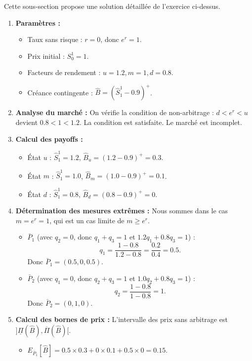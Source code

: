 Cette sous-section propose une solution détaillée de l'exercice ci-dessus.

\begin{enumerate}
    \item \textbf{Paramètres :}
    \begin{itemize}
        \item Taux sans risque : $r=0$, donc $e^r = 1$.
        \item Prix initial : $S_0^1 = 1$.
        \item Facteurs de rendement : $u=1.2, m=1, d=0.8$.
        \item Créance contingente : $\hat{B} = (\hat{S}^1_1 - 0.9)^+$.
    \end{itemize}
    \item \textbf{Analyse du marché :} On vérifie la condition de non-arbitrage : $d < e^r < u$ devient $0.8 < 1 < 1.2$. La condition est satisfaite. Le marché est incomplet.
    \item \textbf{Calcul des payoffs :}
    \begin{itemize}
        \item État $u$ : $\hat{S}^1_1 = 1.2$, $\hat{B}_u = (1.2 - 0.9)^+ = 0.3$.
        \item État $m$ : $\hat{S}^1_1 = 1.0$, $\hat{B}_m = (1.0 - 0.9)^+ = 0.1$.
        \item État $d$ : $\hat{S}^1_1 = 0.8$, $\hat{B}_d = (0.8 - 0.9)^+ = 0$.
    \end{itemize}
    \item \textbf{Détermination des mesures extrêmes :} Nous sommes dans le cas $m = e^r = 1$, qui est un cas limite de $m \ge e^r$.
    \begin{itemize}
        \item $\bar{P}_1$ (avec $q_2=0$, donc $q_1+q_3=1$ et $1.2q_1 + 0.8q_3 = 1$) :
        \[
        q_1 = \frac{1-0.8}{1.2-0.8} = \frac{0.2}{0.4} = 0.5.
        \]
        Donc $\bar{P}_1 = (0.5, 0, 0.5)$.
        \item $\bar{P}_2$ (avec $q_1=0$, donc $q_2+q_3=1$ et $1.0q_2 + 0.8q_3 = 1$) :
        \[
        q_2 = \frac{1-0.8}{1-0.8} = 1.
        \]
        Donc $\bar{P}_2 = (0, 1, 0)$.
    \end{itemize}
    \item \textbf{Calcul des bornes de prix :} L'intervalle des prix sans arbitrage est $]\underline{\Pi}(\hat{B}), \overline{\Pi}(\hat{B})[$.
    \begin{itemize}
        \item $E_{\bar{P}_1}[\hat{B}] = 0.5 \times 0.3 + 0 \times 0.1 + 0.5 \times 0 = 0.15$.

\end{itemize}
\end{enumerate}
